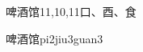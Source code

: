 \begin{entry}{啤酒馆}{11,10,11}{⼝、⾣、⾷}
  \begin{phonetics}{啤酒馆}{pi2jiu3guan3}
  \end{phonetics}
\end{entry}
